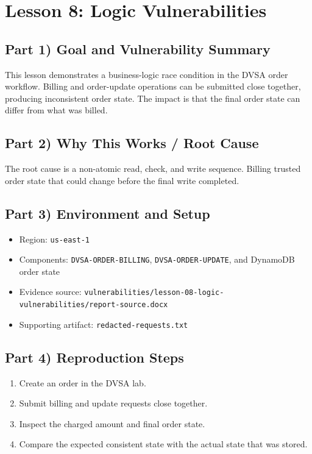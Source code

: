 \documentclass[12pt]{article}
\begin{document}
\clearpage
\section{Lesson 8: Logic Vulnerabilities}

\subsection*{Part 1) Goal and Vulnerability Summary}
This lesson demonstrates a business-logic race condition in the DVSA order workflow. Billing and order-update operations can be submitted close together, producing inconsistent order state. The impact is that the final order state can differ from what was billed.

\subsection*{Part 2) Why This Works / Root Cause}
The root cause is a non-atomic read, check, and write sequence. Billing trusted order state that could change before the final write completed.

\subsection*{Part 3) Environment and Setup}
\begin{itemize}
\item Region: \texttt{us-east-1}
\item Components: \texttt{DVSA-ORDER-BILLING}, \texttt{DVSA-ORDER-UPDATE}, and DynamoDB order state
\item Evidence source: \texttt{vulnerabilities/lesson-08-logic-vulnerabilities/report-source.docx}
\item Supporting artifact: \texttt{redacted-requests.txt}
\end{itemize}

\subsection*{Part 4) Reproduction Steps}
\begin{enumerate}
\item Create an order in the DVSA lab.
\item Submit billing and update requests close together.
\item Inspect the charged amount and final order state.
\item Compare the expected consistent state with the actual state that was stored.
\end{enumerate}
\end{document}

